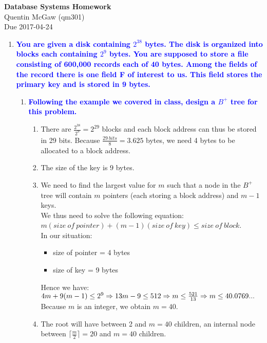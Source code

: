 \documentclass[11pt]{article}
\begin{document}
\begin{center} {\Large\bf Database Systems Homework} \\ Quentin McGaw (qm301) \\ Due 2017-04-24
\end{center}

\begin{enumerate}
\item \textbf{\textcolor{blue}{You are given a disk containing $2^{38}$ bytes. The disk is organized into blocks each containing $2^9$ bytes. You are supposed to store a file consisting of 600,000 records each of 40 bytes. Among the fields of the record there is one field F of interest to us. This field stores the primary key and is stored in 9 bytes.}}
    \begin{enumerate}
        \item \textbf{\textcolor{blue}{Following the example we covered in class, design a $B^+$ tree for this problem.}}
            \begin{enumerate}
                \item There are $ \frac{2^{38}}{2^9} = 2^{29}$ blocks and each block address can thus be stored in 29 bits. Because $\frac{29\ bits}{8} = 3.625$ bytes, we need 4 bytes to be allocated to a block address.
                \item The size of the key is $9$ bytes.
                \item We need to find the largest value for $m$ such that a node in the $B^+$ tree will contain $m$ pointers (each storing a block address) and $m-1$ keys.
                \\ We thus need to solve the following equation: $m(size\ of\ pointer) + (m-1)(size\ of\ key) \leq size\ of\ block$.
                \\ In our situation:
                \begin{itemize}
                    \item size of pointer = 4 bytes
                    \item size of key = 9 bytes
                \end{itemize}
                Hence we have:
                \\ $4m + 9(m-1) \leq 2^9 
                \\ \Rightarrow 13m - 9 \leq 512 \Rightarrow m \leq \frac{521}{13} \Rightarrow m \leq 40.0769...$
                \\ Because $m$ is an integer, we obtain $m = 40$.
                \item The root will have between 2 and $m = 40$ children, an internal node between ${\lceil}\frac{m}{2}{\rceil} = 20$ and $m = 40$ children.

\end{enumerate}
\end{enumerate}
\end{enumerate}
\end{document}
